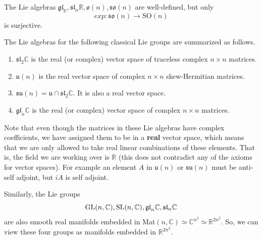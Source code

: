     \begin{theorem}
      The Lie algebras $\mathfrak{gl}_ \mathbb{R}, \mathfrak{sl}_n \mathbb{R}, \mathfrak{o}(n), \mathfrak{so}(n)$ are well-defined, but only 
      \begin{equation}
        exp: \mathfrak{so}(n) \rightarrow \text{SO}(n)
      \end{equation}
      is surjective. 
    \end{theorem}

    \begin{theorem}
      The Lie algebras for the following classical Lie groups are summarized as follows. 
      \begin{enumerate}
        \item $\mathfrak{sl}_2 \mathbb{C}$ is the real (or complex) vector space of traceless complex $n \times n$ matrices. 
        \item $\mathfrak{u}(n)$ is the real vector space of complex $n \times n$ skew-Hermitian matrices. 
        \item $\mathfrak{su}(n) = \mathfrak{u} \cap \mathfrak{sl}_2 \mathbb{C}$. It is also a real vector space. 
        \item $\mathfrak{gl}_n \mathbb{C}$ is the real (or complex) vector space of complex $n \times n$ matrices. 
      \end{enumerate}
      Note that even though the matrices in these Lie algebras have complex coefficients, we have assigned them to be in a \textbf{real} vector space, which means that we are only allowed to take real linear combinations of these elements. That is, the field we are working over is $\mathbb{R}$ (this does not contradict any of the axioms for vector spaces). For example an element $A$ in $\mathfrak{u}(n)$ or $\mathfrak{su}(n)$ must be anti-self adjoint, but $iA$ is self adjoint. 
    \end{theorem}

    Similarly, the Lie groups 
    \begin{equation}
      \operatorname{GL}(n, \mathbb{C}), \operatorname{SL}(n, \mathbb{C}), \mathfrak{gl}_n \mathbb{C}, \mathfrak{sl}_n \mathbb{C}
    \end{equation}
    are also smooth real manifolds embedded in Mat$(n, \mathbb{C}) \simeq \mathbb{C}^{n^2} \simeq \mathbb{R}^{2 n^2}$. So, we can view these four groups as manifolds embedded in $\mathbb{R}^{2 n^2}$. 

